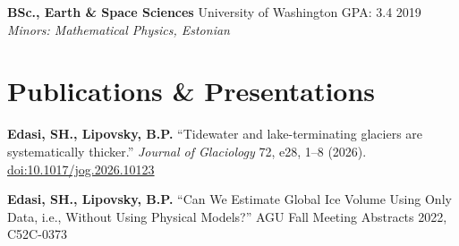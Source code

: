 \documentclass[11pt,a4paper]{article}
\begin{document}
\vspace{0.1cm}
\noindent
\textbf{BSc., Earth \& Space Sciences} \hfill University of Washington \hfill GPA: 3.4 \hfill 2019 \\
\textit{Minors: Mathematical Physics, Estonian}

\section*{Publications \& Presentations}

\noindent
\textbf{Edasi, SH., Lipovsky, B.P.} ``Tidewater and lake-terminating glaciers are systematically thicker.'' \textit{Journal of Glaciology} 72, e28, 1--8 (2026). \href{https://doi.org/10.1017/jog.2026.10123}{doi:10.1017/jog.2026.10123}

\noindent
\textbf{Edasi, SH., Lipovsky, B.P.} ``Can We Estimate Global Ice Volume Using Only Data, i.e., Without Using Physical Models?'' AGU Fall Meeting Abstracts 2022, C52C-0373
\end{document}
